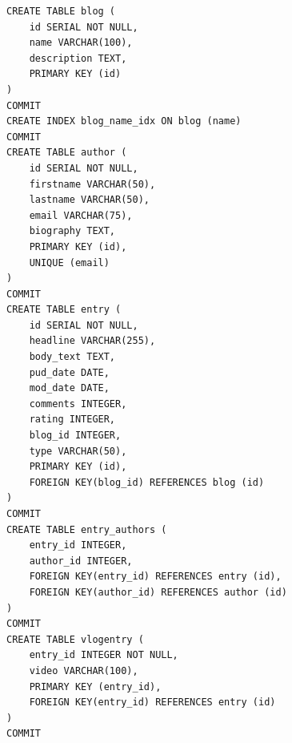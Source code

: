 \documentclass[ing,male,java,dept456]{diploma}						%
\begin{document}
\begin{lstlisting}[label=src:sqla-mappingSQL, caption=Reprezentace schéma z výpisu \ref{src:sqla-mapping} v PostgreSQL vygenerovaná rámcem SQLAlchemy, style=customsql]
CREATE TABLE blog (
	id SERIAL NOT NULL, 
	name VARCHAR(100), 
	description TEXT, 
	PRIMARY KEY (id)
)
COMMIT
CREATE INDEX blog_name_idx ON blog (name)
COMMIT
CREATE TABLE author (
	id SERIAL NOT NULL, 
	firstname VARCHAR(50), 
	lastname VARCHAR(50), 
	email VARCHAR(75), 
	biography TEXT, 
	PRIMARY KEY (id), 
	UNIQUE (email)
)
COMMIT 
CREATE TABLE entry (
	id SERIAL NOT NULL, 
	headline VARCHAR(255), 
	body_text TEXT, 
	pud_date DATE, 
	mod_date DATE, 
	comments INTEGER, 
	rating INTEGER, 
	blog_id INTEGER, 
	type VARCHAR(50), 
	PRIMARY KEY (id), 
	FOREIGN KEY(blog_id) REFERENCES blog (id)
)
COMMIT
CREATE TABLE entry_authors (
	entry_id INTEGER, 
	author_id INTEGER, 
	FOREIGN KEY(entry_id) REFERENCES entry (id), 
	FOREIGN KEY(author_id) REFERENCES author (id)
)
COMMIT
CREATE TABLE vlogentry (
	entry_id INTEGER NOT NULL, 
	video VARCHAR(100), 
	PRIMARY KEY (entry_id), 
	FOREIGN KEY(entry_id) REFERENCES entry (id)
)
COMMIT
\end{lstlisting}
\end{document}
